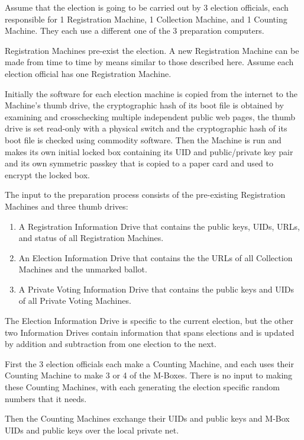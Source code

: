 \documentclass[12pt]{article}
\begin{document}
Assume that the election is going to be carried out by 3 election
officials, each responsible for 1 Registration Machine, 1 Collection
Machine, and 1 Counting Machine.  They each use a different one of
the 3 preparation computers.

Registration Machines pre-exist the election.
A new Registration Machine can be made from time to time
by means similar to those described here.  Assume each election
official has one Registration Machine.

Initially the software for each election machine
is copied from the internet to the Machine's thumb drive,
the cryptographic hash of its boot file is obtained by examining
and crosschecking multiple independent public web pages, the thumb
drive is set read-only with a physical switch and the cryptographic
hash of its boot file is checked using commodity software.
Then the Machine is run and makes its own initial locked box
containing its UID and public/private key pair and its own
symmetric passkey that is copied to a paper card and used to
encrypt the locked box.

The input to the preparation process consists of the pre-existing
Registration Machines and three thumb drives:
\begin{enumerate}
\item A Registration Information Drive that contains the
public keys, UIDs, URLs, and status of all Registration
Machines.
\item An Election Information Drive that contains the
the URLs of all Collection Machines and the unmarked ballot.
\item A Private Voting Information Drive that contains the
public keys and UIDs of all Private Voting Machines.
\end{enumerate}
The Election Information Drive is specific to the current election,
but the other two Information Drives contain information that
spans elections and is updated by addition and subtraction
from one election to the next.

First the 3 election officials each make a Counting Machine, and
each uses their Counting Machine to make 3 or 4 of the M-Boxes.  There
is no input to making these Counting Machines, with
each generating the election specific random numbers that it needs.

Then the Counting Machines exchange their UIDs and public keys and M-Box
UIDs and public keys over the local private net.
\end{document}
